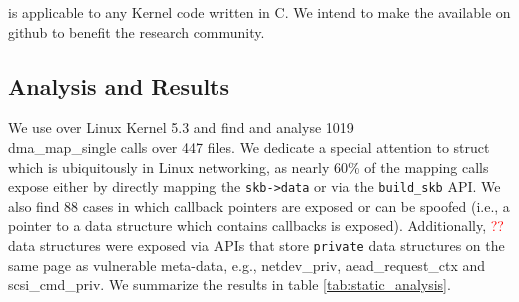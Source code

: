 \tool is applicable to any Kernel code written in C. We intend to make the \tool available on github to benefit the research community.


\subsection{Analysis and Results}
We use \tool over Linux Kernel 5.3 and find and analyse 1019\\ dma\_map\_single calls over 447 files. We dedicate a special attention to struct \shinfo which is ubiquitously in Linux networking, as nearly 60\% of the mapping calls expose \shinfo either by directly mapping the \texttt{skb->data} or via the \texttt{build\_skb} API. We also find 88 cases in which callback pointers are exposed or can be spoofed (i.e., a pointer to a data structure which contains callbacks is exposed). Additionally, \textcolor{red}{??} data structures were exposed via APIs that store \texttt{private} data structures on the same page as vulnerable meta-data, e.g., netdev\_priv, aead\_request\_ctx and scsi\_cmd\_priv. 
We summarize the results in table \ref{tab:static_analysis}. 

